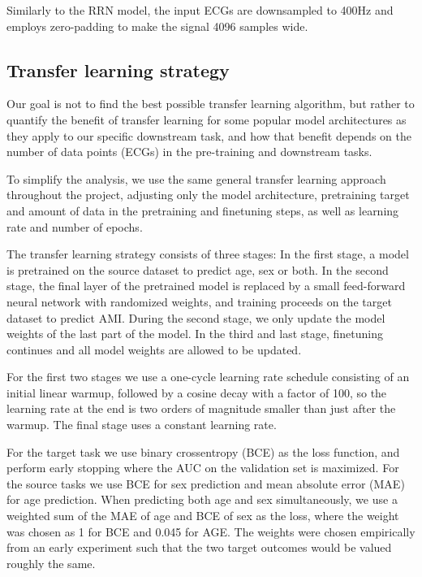 \documentclass[journal,twoside,web]{ieeecolor}
\begin{document}
Similarly to the RRN model, the input ECGs are downsampled to 400Hz and employs zero-padding to make the signal 4096 samples wide. 

\subsection{Transfer learning strategy}
Our goal is not to find the best possible transfer learning algorithm, but rather to quantify the benefit of transfer learning for some popular model architectures as they apply to our specific downstream task, and how that benefit depends on the number of data points (ECGs) in the pre-training and downstream tasks.



To simplify the analysis, we use the same general transfer learning approach throughout the project, adjusting only the model architecture, pretraining target and amount of data in the pretraining and finetuning steps, as well as learning rate and number of epochs. 

The transfer learning strategy consists of three stages: In the first stage, a model is pretrained on the source dataset to predict age, sex or both. In the second stage, the final layer of the pretrained model is replaced by a small feed-forward neural network with randomized weights, and training proceeds on the target dataset to predict AMI. During the second stage, we only update the model weights of the last part of the model. In the third and last stage, finetuning continues and all model weights are allowed to be updated. 

For the first two stages we use a one-cycle learning rate schedule consisting of an initial linear warmup, followed by a cosine decay with a factor of 100, so the learning rate at the end is two orders of magnitude smaller than just after the warmup. The final stage uses a constant learning rate. 

For the target task we use binary crossentropy (BCE) as the loss function, and perform early stopping where the AUC on the validation set is maximized. For the source tasks we use BCE for sex prediction and mean absolute error (MAE) for age prediction. When predicting both age and sex simultaneously, we use a weighted sum of the MAE of age and BCE of sex as the loss, where the weight was chosen as 1 for BCE and 0.045 for AGE. The weights were chosen empirically from an early experiment such that the two target outcomes would be valued roughly the same. 
\end{document}
